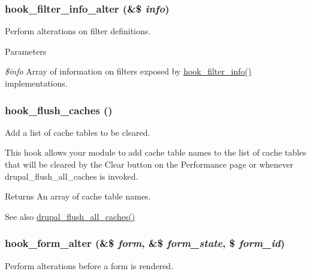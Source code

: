 \hypertarget{group__hooks_ga7404a5c9b0c1cfe68383ae528bc8ebd4}{
\subsubsection[{hook\_\-filter\_\-info\_\-alter}]{\setlength{\rightskip}{0pt plus 5cm}hook\_\-filter\_\-info\_\-alter (\&\$ {\em info})}}
\label{group__hooks_ga7404a5c9b0c1cfe68383ae528bc8ebd4}
Perform alterations on filter definitions.


\begin{DoxyParams}{Parameters}
\item[{\em \$info}]Array of information on filters exposed by \hyperlink{group__hooks_gaf2a2f2a46589420df896a0d42247f15a}{hook\_\-filter\_\-info()} implementations. \end{DoxyParams}
\hypertarget{group__hooks_ga66531e6e564157b7ca45ed07549c9b97}{
\subsubsection[{hook\_\-flush\_\-caches}]{\setlength{\rightskip}{0pt plus 5cm}hook\_\-flush\_\-caches ()}}
\label{group__hooks_ga66531e6e564157b7ca45ed07549c9b97}
Add a list of cache tables to be cleared.

This hook allows your module to add cache table names to the list of cache tables that will be cleared by the Clear button on the Performance page or whenever drupal\_\-flush\_\-all\_\-caches is invoked.

\begin{DoxyReturn}{Returns}
An array of cache table names.
\end{DoxyReturn}
\begin{DoxySeeAlso}{See also}
\hyperlink{common_8inc_ac119432cefbdbb25647944d4ca3f82f8}{drupal\_\-flush\_\-all\_\-caches()} 
\end{DoxySeeAlso}
\hypertarget{group__hooks_ga6df3cea27ae1407aeef4eae5444cb213}{
\subsubsection[{hook\_\-form\_\-alter}]{\setlength{\rightskip}{0pt plus 5cm}hook\_\-form\_\-alter (\&\$ {\em form}, \/  \&\$ {\em form\_\-state}, \/  \$ {\em form\_\-id})}}
\label{group__hooks_ga6df3cea27ae1407aeef4eae5444cb213}
Perform alterations before a form is rendered.

